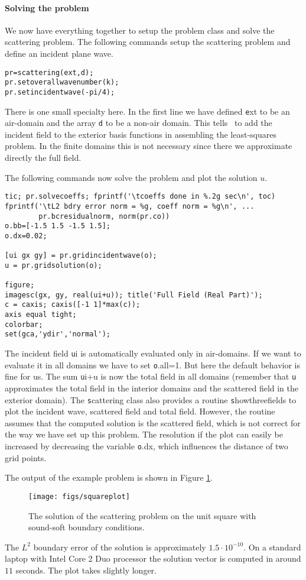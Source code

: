\paragraph{Solving the problem}
We now have everything together to setup the problem class and solve
the scattering problem. The following commands setup the scattering
problem and define an incident plane wave.
\begin{verbatim}
pr=scattering(ext,d);
pr.setoverallwavenumber(k);
pr.setincidentwave(-pi/4);
\end{verbatim}
There is one small specialty here. In the first line we have 
defined {\texttt ext} to be an air-domain and the array {\texttt d} to
be a non-air domain. This tells \mpspack\ to add the incident field to
the exterior basis functions in assembling the least-squares
problem. In the finite domains this is not necessary since there we
approximate directly the full field.



The following commands now solve the problem and plot the solution
$u$.
\begin{verbatim}
tic; pr.solvecoeffs; fprintf('\tcoeffs done in %.2g sec\n', toc)
fprintf('\tL2 bdry error norm = %g, coeff norm = %g\n', ...
        pr.bcresidualnorm, norm(pr.co))
o.bb=[-1.5 1.5 -1.5 1.5];
o.dx=0.02;

[ui gx gy] = pr.gridincidentwave(o);
u = pr.gridsolution(o);

figure;
imagesc(gx, gy, real(ui+u)); title('Full Field (Real Part)');
c = caxis; caxis([-1 1]*max(c));
axis equal tight;
colorbar;
set(gca,'ydir','normal'); 
\end{verbatim}
The incident field {\texttt ui} 
is automatically evaluated only in air-domains. If
we want to evaluate it in all domains we have to set {\texttt
  o.all=1}. But here the default behavior is fine for us. The sum
{\texttt ui+u} is now the total field in all domains (remember that
{\texttt u} approximates the total field in the interior domains
and the scattered field in the exterior domain). The {\texttt
  scattering} class also provides a routine {\texttt showthreefields}
to plot the incident wave, scattered field and total field. However,
the routine assumes that the computed solution is the scattered field,
which is not correct for the way we have set up this problem. The
resolution if the plot can easily be increased by decreasing the
variable {\texttt o.dx}, which influences the distance of two grid points.


The output of the example problem is shown in Figure \ref{fig:squareplot}.
\begin{figure}
\center
\texttt{[image: figs/squareplot]}
\caption{The solution of the scattering problem on the unit
  square with sound-soft boundary conditions.}
\label{fig:squareplot}
\end{figure}
The $L^2$ boundary error of the solution is approximately $1.5\cdot
10^{-10}$. On a standard laptop with Intel Core 2 Duo processor the
solution vector is computed in around $11$ seconds. The plot takes
slightly longer.

